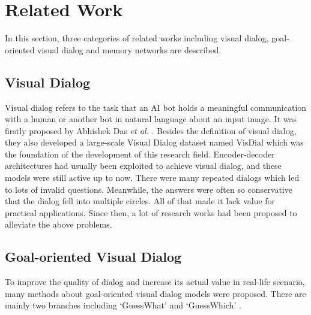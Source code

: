 \documentclass[review]{elsarticle}
\begin{document}
	
	\section{Related Work}In this section, three categories of related works including visual dialog, goal-oriented visual dialog and memory networks are described.
	\subsection{Visual Dialog}
	
	Visual dialog refers to the task that an AI bot holds a meaningful communication with a human or another bot in natural language about an input image. It was firstly proposed by Abhishek Das \textit{et al.} \cite{DBLP:conf/cvpr/DasKGSYMPB17}. Besides the definition of visual dialog, they also developed a large-scale Visual Dialog dataset named VisDial which was the foundation of the development of this research field.
	Encoder-decoder architectures had usually been exploited to achieve visual dialog, and these models were still active up to now. There were many repeated dialogs which led to lots of invalid questions. Meanwhile, the answers were often so conservative that the dialog fell into multiple circles. 
	All of that made it lack value for practical applications. Since then, a lot of research works had been proposed to alleviate the above problems.
	
	\subsection{Goal-oriented Visual Dialog}
	To improve the quality of dialog and increase its actual value in real-life scenario, many methods \cite{DBLP:conf/cvpr/VriesSCPLC17, DBLP:conf/emnlp/HuWLTXWC18, DBLP:conf/coling/ShekharBVBBF18, DBLP:conf/naacl/ShekharVBBPBF19, abbasnejad2019s, shukla2019should, DBLP:conf/iccv/DasKMLB17, DBLP:conf/nips/LuKYPB17, DBLP:conf/atal/AgarwalGSLS19, DBLP:conf/sigdial/ZhangZY18, DBLP:conf/emnlp/MurahariCBPD19} about goal-oriented visual dialog models were proposed. 
	There are mainly two branches including `GuessWhat' \cite{DBLP:conf/cvpr/VriesSCPLC17, DBLP:conf/emnlp/HuWLTXWC18, DBLP:conf/coling/ShekharBVBBF18, DBLP:conf/naacl/ShekharVBBPBF19, abbasnejad2019s} and `GuessWhich' \cite{shukla2019should, DBLP:conf/iccv/DasKMLB17, DBLP:conf/nips/LuKYPB17, DBLP:conf/atal/AgarwalGSLS19, DBLP:conf/sigdial/ZhangZY18, DBLP:conf/emnlp/MurahariCBPD19}. 
	
\end{document}
